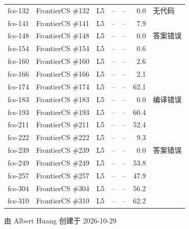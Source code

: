 \documentclass[11pt,a4paper,fontset=none]{ctexart}
\begin{document}
{\begin{longtable}{@{}l>{\raggedright\arraybackslash}p{3.4cm}llrr>{\raggedright\arraybackslash}p{3.1cm}@{}}
fcs-132 & FrontierCS \#132 & L5 & – & – & 0.0 & 无代码 \\
fcs-141 & FrontierCS \#141 & L5 & – & – & 7.9 &  \\
fcs-148 & FrontierCS \#148 & L5 & – & – & 0.0 & 答案错误 \\
fcs-154 & FrontierCS \#154 & L5 & – & – & 0.6 &  \\
fcs-160 & FrontierCS \#160 & L5 & – & – & 2.6 &  \\
fcs-166 & FrontierCS \#166 & L5 & – & – & 2.1 &  \\
fcs-174 & FrontierCS \#174 & L5 & – & – & 62.1 &  \\
fcs-183 & FrontierCS \#183 & L5 & – & – & 0.0 & 编译错误 \\
fcs-193 & FrontierCS \#193 & L5 & – & – & 60.4 &  \\
fcs-211 & FrontierCS \#211 & L5 & – & – & 52.4 &  \\
fcs-222 & FrontierCS \#222 & L5 & – & – & 9.3 &  \\
fcs-239 & FrontierCS \#239 & L5 & – & – & 0.0 & 答案错误 \\
fcs-249 & FrontierCS \#249 & L5 & – & – & 53.8 &  \\
fcs-257 & FrontierCS \#257 & L5 & – & – & 47.9 &  \\
fcs-304 & FrontierCS \#304 & L5 & – & – & 56.2 &  \\
fcs-310 & FrontierCS \#310 & L5 & – & – & 62.2 &  \\
\bottomrule
\end{longtable}}
\par\vspace{2em}\begin{flushright}由 Albert Huang 创建于 2026-10-29\end{flushright}
\end{document}
